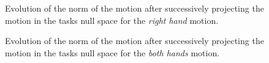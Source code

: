 \documentclass[letterpaper, 10pt, conference]{ieeeconf}      %
\begin{document}
\begin{figure}[t]

\caption{Evolution of the norm of the motion after successively projecting the motion in the tasks null space for
the \emph{right hand} motion.}
\label{fig:exp1:PqdotNormsR}
\end{figure}

\begin{figure}[t]

\caption{Evolution of the norm of the motion after successively projecting the motion in the tasks null space for
the \emph{both hands} motion.}
\label{fig:exp1:PqdotNormsRL}
\end{figure}
\end{document}
